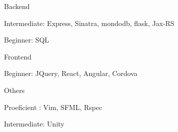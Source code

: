 \begin{cvskills}
  \cvskill
    {Backend} %
    {
      \begin{cvitems} %
        \item Intermediate:                 Express, Sinatra, mondodb, flask, Jax-RS
        \item Beginner:\hspace{5mm}         SQL
      \end{cvitems}
    }
  \cvskill
    {Frontend} %
    {
      \begin{cvitems} %
      \item Beginner:\hspace{5mm}                     JQuery, React, Angular, Cordova
      \end{cvitems}
    }
  \cvskill
    {Others} %
    {
      \begin{cvitems} %
      \item Proeficient :\hspace{2.5mm}   Vim, SFML, Rspec
      \item Intermediate:                   Unity
      \end{cvitems}
    }


\end{cvskills}

